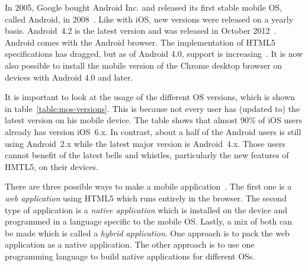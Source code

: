 \documentclass[a4paper]{artikel3}
\begin{document}
In 2005, Google bought Android Inc. and released its first stable mobile OS, called Android, in 2008~\cite{Satyesh2012}.
Like with iOS, new versions were released on a yearly basis.
Android~4.2 is the latest version and was released in October 2012~\cite{Sawers2012}.
Android comes with the Android browser.
The implementation of HTML5 specifications has dragged, but as of Android 4.0, support is increasing~\cite{Hales2012}.
It is now also possible to install the mobile version of the Chrome desktop browser on devices with Android 4.0 and later.

It is important to look at the usage of the different OS versions, which is shown in table~\ref{table:mos-versions}.
This is because not every user has (updated to) the latest version on his mobile device.
The table shows that almost 90\% of iOS users already has version iOS~6.x.
In contrast, about a half of the Android users is still using Android~2.x while the latest major version is Android~4.x. 
Those users cannot benefit of the latest bells and whistles, particularly the new features of HMTL5, on their devices.

\begin{table}[t]
\centering
{}
\quad
{}
\caption{Usage of iOS versions on May 8, 2013 and Android versions on May 1, 2013 \protect\cite{Smith2013,Android2013}.}
\label{table:mos-versions}
\end{table}

There are three possible ways to make a mobile application~\cite{Accenture2012,Hales2012}.
The first one is a \emph{web application} using HTML5 which runs entirely in the browser.
The second type of application is a \emph{native application} which is installed on the device and programmed in a language specific to the mobile OS.
Lastly, a mix of both can be made which is called a \emph{hybrid application}.
One approach is to pack the web application as a native application.
The other approach is to use one programming language to build native applications for different OSs.
\end{document}
